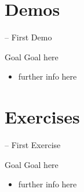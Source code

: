 \documentclass[presentation]{beamer}\mode<presentation>{\usetheme{AMSBolognaFC}}
\begin{document}
\section{Demos}

\startDemo

\begin{frame}{\currentDemo{} -- First Demo}
    \begin{block}{Goal}
        Goal here
    \end{block}
    \begin{itemize}
        \item further info here
    \end{itemize}
\end{frame}

\section{Exercises}

\startExercise

\begin{frame}{\currentExercise{} -- First Exercise}
    \begin{block}{Goal}
        Goal here
    \end{block}
    \begin{itemize}
        \item further info here
    \end{itemize}
\end{frame}

\section*{}

\frame{\titlepage}

\section*{\refname}

\begin{frame}[c,noframenumbering]{\refname}
    \scriptsize
    \nocite{*}
    
    
\end{frame}

\end{document}
